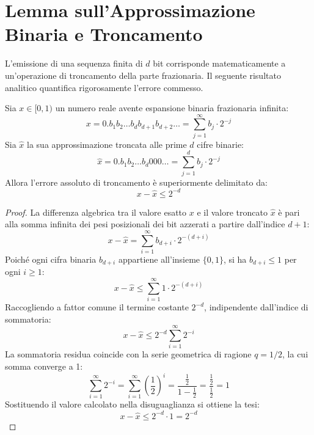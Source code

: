 \FloatBarrier
\section{Lemma sull'Approssimazione Binaria e Troncamento}
\label{sec:lemma-troncamento-binario}

L'emissione di una sequenza finita di $d$ bit corrisponde matematicamente a un'operazione di troncamento della parte frazionaria. Il seguente risultato analitico quantifica rigorosamente l'errore commesso.

\begin{lemma}
\label{lem:troncamento-binario}
Sia $x \in [0, 1)$ un numero reale avente espansione binaria frazionaria infinita:
\begin{equation}
  x = 0.b_1 b_2 \dots b_d b_{d+1} b_{d+2} \dots = \sum_{j=1}^{\infty} b_j \cdot 2^{-j}
\end{equation}
Sia $\hat{x}$ la sua approssimazione troncata alle prime $d$ cifre binarie:
\begin{equation}
  \hat{x} = 0.b_1 b_2 \dots b_d 0 0 0 \dots = \sum_{j=1}^{d} b_j \cdot 2^{-j}
\end{equation}
Allora l'errore assoluto di troncamento \`e superiormente delimitato da:
\begin{equation}
  x - \hat{x} \le 2^{-d}
\end{equation}
\end{lemma}

\begin{proof}
La differenza algebrica tra il valore esatto $x$ e il valore troncato $\hat{x}$ \`e pari alla somma infinita dei pesi posizionali dei bit azzerati a partire dall'indice $d+1$:
\begin{equation}
  x - \hat{x} = \sum_{i=1}^{\infty} b_{d+i} \cdot 2^{-(d+i)}
\end{equation}
Poich\'e ogni cifra binaria $b_{d+i}$ appartiene all'insieme $\{0, 1\}$, si ha $b_{d+i} \le 1$ per ogni $i \ge 1$:
\begin{equation}
  x - \hat{x} \le \sum_{i=1}^{\infty} 1 \cdot 2^{-(d+i)}
\end{equation}
Raccogliendo a fattor comune il termine costante $2^{-d}$, indipendente dall'indice di sommatoria:
\begin{equation}
  x - \hat{x} \le 2^{-d} \sum_{i=1}^{\infty} 2^{-i}
\end{equation}
La sommatoria residua coincide con la serie geometrica di ragione $q = 1/2$, la cui somma converge a 1:
\begin{equation}
  \sum_{i=1}^{\infty} 2^{-i} = \sum_{i=1}^{\infty} \left(\frac{1}{2}\right)^i = \frac{\frac{1}{2}}{1 - \frac{1}{2}} = \frac{\frac{1}{2}}{\frac{1}{2}} = 1
\end{equation}
Sostituendo il valore calcolato nella disuguaglianza si ottiene la tesi:
\begin{equation}
  x - \hat{x} \le 2^{-d} \cdot 1 = 2^{-d}
\end{equation}
\end{proof}

